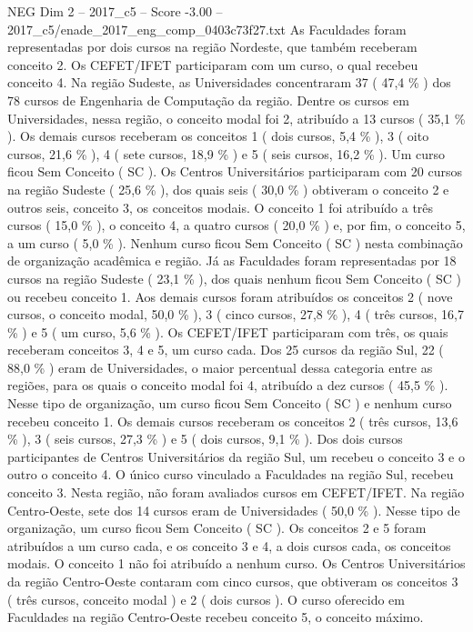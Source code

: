 \begin{textsample}{NEG Dim 2 – 2017\_c5 – Score -3.00 – 2017\_c5/enade\_2017\_eng\_comp\_0403c73f27.txt}
As Faculdades foram representadas por dois cursos na região Nordeste, que também receberam conceito 2.
Os CEFET/IFET participaram com um curso, o qual recebeu conceito 4.
Na região Sudeste, as Universidades concentraram 37 ( 47,4 \% ) dos 78 cursos de Engenharia de Computação da região.
Dentre os cursos em Universidades, nessa região, o conceito modal foi 2, atribuído a 13 cursos ( 35,1 \% ).
Os demais cursos receberam os conceitos 1 ( dois cursos, 5,4 \% ), 3 ( oito cursos, 21,6 \% ), 4 ( sete cursos, 18,9 \% ) e 5 ( seis cursos, 16,2 \% ).
Um curso ficou Sem Conceito ( SC ).
Os Centros Universitários participaram com 20 cursos na região Sudeste ( 25,6 \% ), dos quais seis ( 30,0 \% ) obtiveram o conceito 2 e outros seis, conceito 3, os conceitos modais.
O conceito 1 foi atribuído a três cursos ( 15,0 \% ), o conceito 4, a quatro cursos ( 20,0 \% ) e, por fim, o conceito 5, a um curso ( 5,0 \% ).
Nenhum curso ficou Sem Conceito ( SC ) nesta combinação de organização acadêmica e região.
Já as Faculdades foram representadas por 18 cursos na região Sudeste ( 23,1 \% ), dos quais nenhum ficou Sem Conceito ( SC ) ou recebeu conceito 1.
Aos demais cursos foram atribuídos os conceitos 2 ( nove cursos, o conceito modal, 50,0 \% ), 3 ( cinco cursos, 27,8 \% ), 4 ( três cursos, 16,7 \% ) e 5 ( um curso, 5,6 \% ).
Os CEFET/IFET participaram com três, os quais receberam conceitos 3, 4 e 5, um curso cada.
Dos 25 cursos da região Sul, 22 ( 88,0 \% ) eram de Universidades, o maior percentual dessa categoria entre as regiões, para os quais o conceito modal foi 4, atribuído a dez cursos ( 45,5 \% ).
Nesse tipo de organização, um curso ficou Sem Conceito ( SC ) e nenhum curso recebeu conceito 1.
Os demais cursos receberam os conceitos 2 ( três cursos, 13,6 \% ), 3 ( seis cursos, 27,3 \% ) e 5 ( dois cursos, 9,1 \% ).
Dos dois cursos participantes de Centros Universitários da região Sul, um recebeu o conceito 3 e o outro o conceito 4.
O único curso vinculado a Faculdades na região Sul, recebeu conceito 3.
Nesta região, não foram avaliados cursos em CEFET/IFET.
Na região Centro-Oeste, sete dos 14 cursos eram de Universidades ( 50,0 \% ).
Nesse tipo de organização, um curso ficou Sem Conceito ( SC ).
Os conceitos 2 e 5 foram atribuídos a um curso cada, e os conceito 3 e 4, a dois cursos cada, os conceitos modais.
O conceito 1 não foi atribuído a nenhum curso.
Os Centros Universitários da região Centro-Oeste contaram com cinco cursos, que obtiveram os conceitos 3 ( três cursos, conceito modal ) e 2 ( dois cursos ).
O curso oferecido em Faculdades na região Centro-Oeste recebeu conceito 5, o conceito máximo.

\end{textsample}
